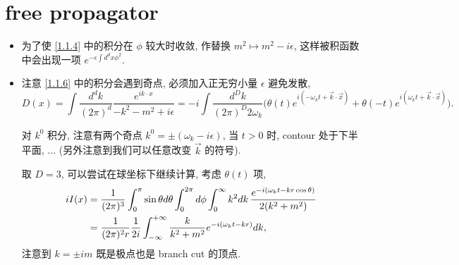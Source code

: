 \section{free propagator}
\begin{itemize}
	\item 为了使 \eqref{1.1.4} 中的积分在 $\phi$ 较大时收敛, 作替换 $m^2 \mapsto m^2 - i \epsilon$, 这样被积函数中会出现一项 $e^{- \epsilon \int d^d x \phi^2}$.
	
	\item 注意 \eqref{1.1.6} 中的积分会遇到奇点, 必须加入正无穷小量 $\epsilon$ 避免发散,
	\begin{equation} \label{1.2.1}
		D(x) = \int \frac{d^d k}{(2 \pi)^d} \frac{e^{i k \cdot x}}{- k^2 - m^2 + i \epsilon} = - i \int \frac{d^D k}{(2 \pi)^D 2 \omega_k} \Big( \theta(t) e^{i (- \omega_k t + \vec{k} \cdot \vec{x})} + \theta(- t) e^{i (\omega_k t + \vec{k} \cdot \vec{x})} \Big).
	\end{equation}
	
	\begin{tcolorbox}[title=calculation:]
		对 $k^0$ 积分, 注意有两个奇点 $k^0 = \pm (\omega_k - i \epsilon)$, 当 $t > 0$ 时, contour 处于下半平面, ... (另外注意到我们可以任意改变 $\vec{k}$ 的符号).
		
		取 $D = 3$, 可以尝试在球坐标下继续计算, 考虑 $\theta(t)$ 项,
		\begin{align}
			i I(x) &= \frac{1}{(2 \pi)^3} \int_0^\pi \sin \theta d\theta \int_0^{2 \pi} d\phi \int_0^\infty k^2 dk \, \frac{e^{- i (\omega_k t - k r \cos \theta)}}{2 (k^2 + m^2)} \notag \\
			&= \frac{1}{(2 \pi)^2 r} \frac{1}{2 i} \int_{- \infty}^{+ \infty} \frac{k}{k^2 + m^2} e^{- i (\omega_k t - k r)} dk,
		\end{align}
		注意到 $k = \pm i m$ 既是极点也是 branch cut 的顶点.
		

\end{tcolorbox}
\end{itemize}
